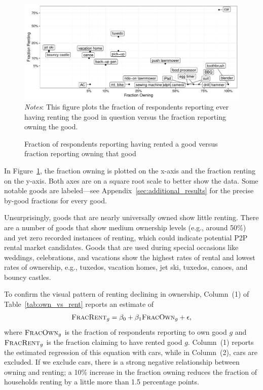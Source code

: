 \documentclass[11pt]{article}
\begin{document}
\begin{figure}
\centering 
\caption{Fraction of respondents reporting having rented a good versus fraction reporting owning that good\label{fig:scatter} }
\begin{minipage}{0.90 \linewidth}
  \includegraphics[width = \linewidth]{./plots/scatter_rent_v_own.pdf} \\
    {\footnotesize
    \emph{Notes}: This figure plots the fraction of respondents reporting ever having renting the good in question versus the fraction reporting owning the good. 
    }
\end{minipage}
\end{figure} 

In Figure~\ref{fig:scatter}, the fraction owning is plotted on the x-axis and the fraction renting on the y-axis.
Both axes are on a square root scale to better show the data. 
Some notable goods are labeled---see Appendix~\ref{sec:additional_results} for the precise by-good fractions for every good.

Unsurprisingly, goods that are nearly universally owned show little renting. 
There are a number of goods that show medium ownership levels (e.g., around 50\%) and yet zero recorded instances of renting, which could indicate potential P2P rental market candidates. 
Goods that are used during special occasions like weddings, celebrations, and vacations show the highest rates of rental and lowest rates of ownership, e.g., tuxedos, vacation homes, jet ski, tuxedos, canoes, and bouncy castles. 



To confirm the visual pattern of renting declining in ownership, Column~(1) of Table~\ref{tab:own_vs_rent} reports an estimate of 
\begin{align}
\textsc{FracRent}_g = \beta_0 + \beta_1 \textsc{FracOwn}_g + \epsilon,  
\end{align} 
where $\textsc{FracOwn}_g$ is the fraction of respondents reporting to own good $g$ and $\textsc{FracRent}_g$ is the fraction claiming to have rented good $g$.
Column~(1) reports the estimated regression of this equation with cars, while in Column~(2), cars are excluded.
If we exclude cars, there is a strong negative relationship between owning and renting;
a 10\% increase in the fraction owning reduces the fraction of households renting by a little more than 1.5 percentage points. 
\end{document}
